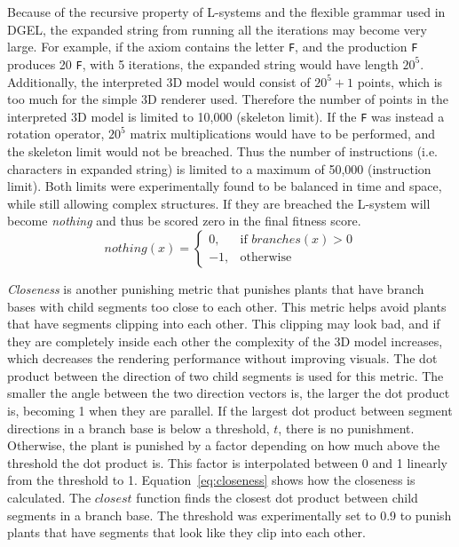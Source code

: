 Because of the recursive property of \glspl{L-system} and the flexible grammar used in \gls{DGEL}, the expanded string from running all the iterations may become very large.
For example, if the axiom contains the letter \texttt{F}, and the production \texttt{F} produces 20 \texttt{F}, with 5 iterations, the expanded string would have length $20^5$.
Additionally, the interpreted 3D model would consist of $20^5 + 1$ points, which is too much for the simple 3D renderer used.
Therefore the number of points in the interpreted 3D model is limited to 10,000 (skeleton limit).
If the \texttt{F} was instead a rotation operator, $20^5$ matrix multiplications would have to be performed, and the skeleton limit would not be breached.
Thus the number of instructions (i.e. characters in expanded string) is limited to a maximum of 50,000 (instruction limit).
Both limits were experimentally found to be balanced in time and space, while still allowing complex structures.
If they are breached the \gls{L-system} will become \textit{nothing} and thus be scored zero in the final fitness score.
\begin{equation}
\label{eq:nothing}
    nothing(x) =
    \begin{cases}
        0,& \text{if } branches(x) > 0  \\
        -1,& \text{otherwise}
    \end{cases}
\end{equation}

\textit{Closeness} is another punishing metric that punishes plants that have \glspl{branch base} with \glspl{child segment} too close to each other.
This metric helps avoid plants that have segments clipping into each other.
This clipping may look bad, and if they are completely inside each other the complexity of the 3D model increases, which decreases the rendering performance without improving visuals.
The dot product between the direction of two \glspl{child segment} is used for this metric.
The smaller the angle between the two direction vectors is, the larger the dot product is, becoming 1 when they are parallel.
If the largest dot product between segment directions in a \gls{branch base} is below a threshold, $t$, there is no punishment.
Otherwise, the plant is punished by a factor depending on how much above the threshold the dot product is.
This factor is interpolated between 0 and 1 linearly from the threshold to 1.
Equation~\ref{eq:closeness} shows how the closeness is calculated.
The $closest$ function finds the closest dot product between \glspl{child segment} in a \gls{branch base}.
The threshold was experimentally set to 0.9 to punish plants that have segments that look like they clip into each other.

